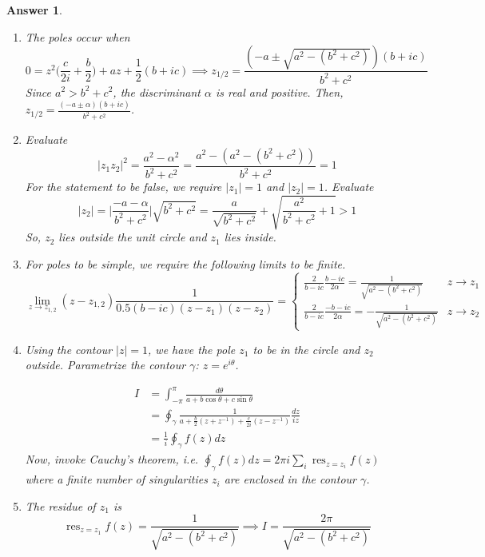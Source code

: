 \documentclass[a4paper]{article}
\DeclareMathOperator{\res}{res}
\newtheorem{ans}{Answer}[section]
\theoremstyle{new}
\begin{document}
\begin{ans}\leavevmode
\begin{enumerate}[label=(\roman*)]
\item The poles occur when 
$$0=z^2\bigg(\frac{c}{2i}+\frac{b}{2}\bigg)+az+\frac{1}{2}(b+ic)\implies z_{1/2}=\frac{(-a\pm\sqrt{a^2-(b^2+c^2)})(b+ic)}{b^2+c^2}$$
Since $a^2>b^2+c^2$, the discriminant $\alpha$ is real and positive. Then, $z_{1/2}=\frac{(-a\pm\alpha)(b+ic)}{b^2+c^2}$.
\item Evaluate
$$|z_1z_2|^2=\frac{a^2-\alpha^2}{b^2+c^2}=\frac{a^2-(a^2-(b^2+c^2))}{b^2+c^2}=1$$
For the statement to be false, we require $|z_1|=1$ and $|z_2|=1$. Evaluate
$$|z_2|=\bigg|\frac{-a-\alpha}{b^2+c^2}\bigg|\sqrt{b^2+c^2}=\frac{a}{\sqrt{b^2+c^2}}+\sqrt{\frac{a^2}{b^2+c^2}+1}>1$$
So, $z_2$ lies outside the unit circle and $z_1$ lies inside.
\item For poles to be simple, we require the following limits to be finite.
$$\lim_{z\rightarrow z_{1,2}}(z-z_{1,2})\frac{1}{0.5(b-ic)(z-z_1)(z-z_2)}=
\left\{
        \begin{array}{ll}
      \frac{2}{b-ic}\frac{b-ic}{2\alpha}=\frac{1}{\sqrt{a^2-(b^2+c^2)}}& z\rightarrow z_1 \\
      \frac{2}{b-ic}\frac{-b-ic}{2\alpha}=-\frac{1}{\sqrt{a^2-(b^2+c^2)}} & z\rightarrow z_2
        \end{array}
    \right.$$
\item Using the contour $|z|=1$, we have the pole $z_1$ to be in the circle and $z_2$ outside. Parametrize the contour $\gamma$: $z=e^{i\theta}$.
 \begin{center}
  \end{center}

\begin{align}
    I&=\int_{-\pi}^\pi\frac{d\theta}{a+b\cos\theta+c\sin\theta}\nonumber\\&=\oint_{\gamma}\frac{1}{a+\frac{b}{2}(z+z^{-1})+\frac{c}{2i}(z-z^{-1})}\frac{dz}{iz}\nonumber\\&=\frac{1}{i}\oint_\gamma f(z)dz\nonumber
\end{align}
Now, invoke Cauchy's theorem, i.e. $\oint_{\gamma}f(z)dz=2\pi i\sum_i\res_{z=z_i}f(z)$ where a finite number of singularities $z_i$ are enclosed in the contour $\gamma$.
\item The residue of $z_1$ is
$$\res_{z=z_1}f(z)=\frac{1}{\sqrt{a^2-(b^2+c^2)}}\implies I=\frac{2\pi}{\sqrt{a^2-(b^2+c^2)}}$$
\end{enumerate}
\end{ans}
\end{document}
